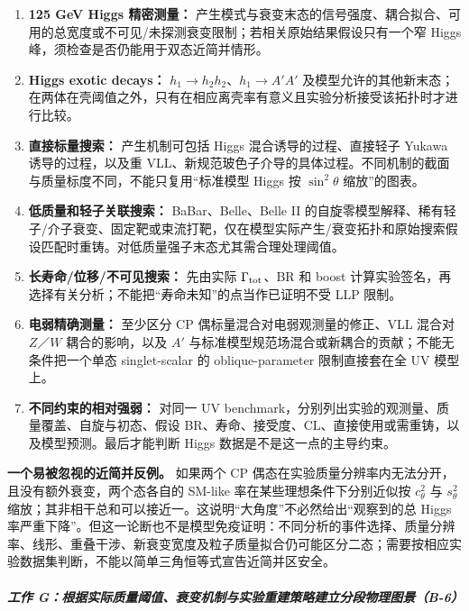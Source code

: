 \documentclass[
  chinese,
  UTF8]{ctexart}
\providecommand{\tightlist}{%
  \setlength{\itemsep}{0pt}\setlength{\parskip}{0pt}}
\begin{document}
\begin{enumerate}
\def\labelenumi{\arabic{enumi}.}
\tightlist
\item
  \textbf{125 GeV Higgs 精密测量：}
  产生模式与衰变末态的信号强度、耦合拟合、可用的总宽度或不可见/未探测衰变限制；若相关原始结果假设只有一个窄
  Higgs 峰，须检查是否仍能用于双态近简并情形。
\item
  \textbf{Higgs exotic decays：} \(h_1\to h_2h_2\)、\(h_1\to A'A'\)
  及模型允许的其他新末态；在两体在壳阈值之外，只有在相应离壳率有意义且实验分析接受该拓扑时才进行比较。
\item
  \textbf{直接标量搜索：} 产生机制可包括 Higgs 混合诱导的过程、直接轻子
  Yukawa 诱导的过程，以及重
  VLL、新规范玻色子介导的具体过程。不同机制的截面与质量标度不同，不能只复用``标准模型
  Higgs 按 \(\sin^2\theta\) 缩放''的图表。
\item
  \textbf{低质量和轻子关联搜索：} BaBar、Belle、Belle II
  的自旋零模型解释、稀有轻子/介子衰变、固定靶或束流打靶，仅在模型实际产生/衰变拓扑和原始搜索假设匹配时重铸。对低质量强子末态尤其需合理处理阈值。
\item
  \textbf{长寿命/位移/不可见搜索：} 先由实际 \(\Gamma_{\rm tot}\)、BR 和
  boost
  计算实验签名，再选择有关分析；不能把``寿命未知''的点当作已证明不受 LLP
  限制。
\item
  \textbf{电弱精确测量：} 至少区分 CP 偶标量混合对电弱观测量的修正、VLL
  混合对 \(Z\)／\(W\) 耦合的影响，以及 \(A'\)
  与标准模型规范场混合或新耦合的贡献；不能无条件把一个单态
  singlet-scalar 的 oblique-parameter 限制直接套在全 UV 模型上。
\item
  \textbf{不同约束的相对强弱：} 对同一 UV
  benchmark，分别列出实验的观测量、质量覆盖、自旋与初态、假设
  BR、寿命、接受度、CL、直接使用或需重铸，以及模型预测。最后才能判断
  Higgs 数据是不是这一点的主导约束。
\end{enumerate}

\textbf{一个易被忽视的近简并反例。} 如果两个 CP
偶态在实验质量分辨率内无法分开，且没有额外衰变，两个态各自的 SM-like
率在某些理想条件下分别近似按 \(c_\theta^2\) 与 \(s_\theta^2\)
缩放；其非相干总和可以接近一。这说明``大角度''不必然给出``观察到的总
Higgs
率严重下降''。但这一论断也不是模型免疫证明：不同分析的事件选择、质量分辨率、线形、重叠干涉、新衰变宽度及粒子质量拟合仍可能区分二态；需要按相应实验数据集判断，不能以简单三角恒等式宣告近简并区安全。

\subparagraph{工作
G：根据实际质量阈值、衰变机制与实验重建策略建立分段物理图景（B-6）}\label{ux5de5ux4f5c-gux6839ux636eux5b9eux9645ux8d28ux91cfux9608ux503cux8870ux53d8ux673aux5236ux4e0eux5b9eux9a8cux91cdux5efaux7b56ux7565ux5efaux7acbux5206ux6bb5ux7269ux7406ux56feux666fb-6}
\end{document}
